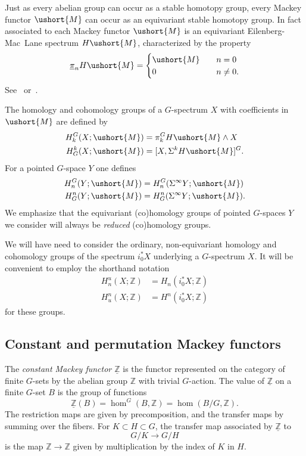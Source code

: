 \documentclass{amsart}
\theoremstyle{definition}
\theoremstyle{remark}
\newcommand{\Z}{{\mathbb Z}}
\newcommand{\pim}{\underline{\pi}}
\newcommand{\Zm}{\underline{\Z}}
\newcommand{\Mm}{\ushort{M}}
\begin{document}
Just as every abelian group can occur as a stable homotopy group,
every Mackey functor $\Mm$ can occur as an equivariant stable homotopy
group.  In fact associated to each Mackey functor $\Mm$ is an
equivariant Eilenberg-Mac~Lane spectrum $H\Mm$, characterized by the
property
\[
\pim_{n}H\Mm=\begin{cases}
\Mm &\quad n=0 \\
0 &\quad n\ne 0.
\end{cases}
\]
See~\cite[\S5]{MR1361893} or~\cite{MR598689}. 

The homology and cohomology groups of a $G$-spectrum $X$ with
coefficients in $\Mm$ are defined by
\begin{align*}
H_{k}^{G}(X;\Mm) &= \pi^{G}_{k}H\Mm\wedge X \\
H_{G}^{k}(X;\Mm) &= [X,\Sigma^{k}H\Mm]^{G}.
\end{align*}
For a pointed $G$-space $Y$ one defines
\begin{align*}
H^{G}_{n}(Y;\Mm) &= H^{G}_{n}(\Sigma^{\infty}Y;\Mm) \\
H_{G}^{n}(Y;\Mm) &= H_{G}^{n}(\Sigma^{\infty} Y;\Mm).
\end{align*}
We emphasize that the equivariant (co)homology groups of pointed
$G$-spaces $Y$ we consider will always be {\em reduced} (co)homology
groups.

We will have need to consider the ordinary,
non-equivariant homology and cohomology groups of the spectrum
$i_{0}^{\ast}X$ underlying a $G$-spectrum $X$.  It will be convenient
to employ the shorthand notation
\begin{align*}
H_{n}^{u}(X;\Z) &= H_{n}(i_{0}^{\ast}X;\Z) \\
H^{n}_{u}(X;\Z) &= H^{n}(i_{0}^{\ast}X;\Z)
\end{align*}
for these groups.

\subsection{Constant and permutation Mackey functors}
\label{sec:const-perm-mack}

The {\em constant Mackey functor $\Zm$} is the functor represented
on the category of finite $G$-sets by the abelian group $\Z$ with
trivial $G$-action.  The value of $\Zm$ on a finite $G$-set $B$ is the
group of functions
\[
\Zm(B)=\hom^{G}(B,\Z)=\hom(B/G,\Z).
\]
The restriction maps are given by precomposition, and the transfer
maps by summing over the fibers.  For $K\subset H\subset G$, the
transfer map associated by $\Zm$ to
\[
G/K\to G/H
\]
is the map $\Z\to\Z$ given by multiplication by the index of $K$ in
$H$.   
\end{document}
